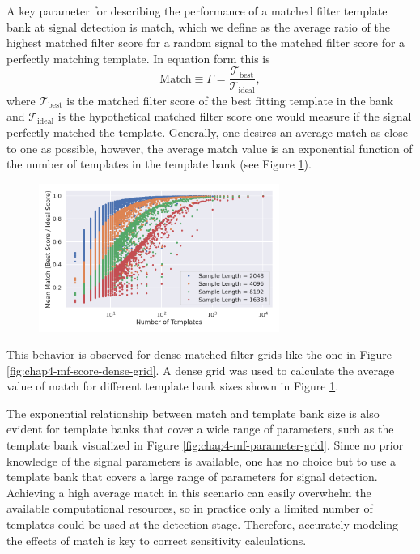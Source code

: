 A key parameter for describing the performance of a matched filter template bank at signal detection is match, which we define as the average ratio of the highest matched filter score for a random signal to the matched filter score for a perfectly matching template. In equation form this is 
\begin{equation}
    \textrm{Match}\equiv\Gamma=\frac{\mathcal{T}_\mathrm{best}}{\mathcal{T}_\textrm{ideal}},
\end{equation}
where $\mathcal{T}_\textrm{best}$ is the matched filter score of the best fitting template in the bank and $\mathcal{T}_\textrm{ideal}$ is the hypothetical matched filter score one would measure if the signal perfectly matched the template. Generally, one desires an average match as close to one as possible, however, the average match value is an exponential function of the number of templates in the template bank (see Figure \ref{fig:chap4-mean-match-dense-grid}).
\begin{figure}[htbp]
    \centering
    \includegraphics*[width=0.7\textwidth]{figs/Chapter-4/220114_mean_match_vs_number_of_templates_87.0_0cm_modify_sample_number.png}
    \caption{\label{fig:chap4-mean-match-dense-grid}}
\end{figure}
This behavior is observed for dense matched filter grids like the one in Figure \ref{fig:chap4-mf-score-dense-grid}. A dense grid was used to calculate the average value of match for different template bank sizes shown in Figure \ref{fig:chap4-mean-match-dense-grid}. 

The exponential relationship between match and template bank size is also evident for template banks that cover a wide range of parameters, such as the template bank visualized in Figure \ref{fig:chap4-mf-parameter-grid}. Since no prior knowledge of the signal parameters is available, one has no choice but to use a template bank that covers a large range of parameters for signal detection. Achieving a high average match in this scenario can easily overwhelm the available computational resources, so in practice only a limited number of templates could be used at the detection stage. Therefore, accurately modeling the effects of match is key to correct sensitivity calculations.

